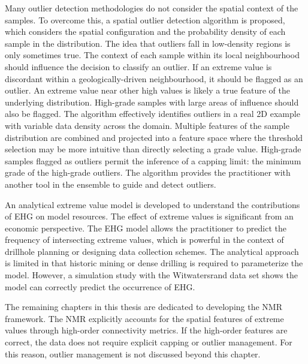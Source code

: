Many outlier detection methodologies do not consider the spatial context of the samples. To overcome this, a spatial outlier detection algorithm is proposed, which considers the spatial configuration and the probability density of each sample in the distribution. The idea that outliers fall in low-density regions is only sometimes true. The context of each sample within its local neighbourhood should influence the decision to classify an outlier. If an extreme value is discordant within a geologically-driven neighbourhood, it should be flagged as an outlier. An extreme value near other high values is likely a true feature of the underlying distribution. High-grade samples with large areas of influence should also be flagged. The algorithm effectively identifies outliers in a real \gls{2D} example with variable data density across the domain. Multiple features of the sample distribution are combined and projected into a feature space where the threshold selection may be more intuitive than directly selecting a grade value. High-grade samples flagged as outliers permit the inference of a capping limit: the minimum grade of the high-grade outliers. The algorithm provides the practitioner with another tool in the ensemble to guide and detect outliers.

An analytical extreme value model is developed to understand the contributions of \gls{EHG} on model resources. The effect of extreme values is significant from an economic perspective. The \gls{EHG} model allows the practitioner to predict the frequency of intersecting extreme values, which is powerful in the context of drillhole planning or designing data collection schemes. The analytical approach is limited in that historic mining or dense drilling is required to parameterize the model. However, a simulation study with the Witwatersrand data set shows the model can correctly predict the occurrence of \gls{EHG}.

The remaining chapters in this thesis are dedicated to developing the \gls{NMR} framework. The \gls{NMR} explicitly accounts for the spatial features of extreme values through high-order connectivity metrics. If the high-order features are correct, the data does not require explicit capping or outlier management. For this reason, outlier management is not discussed beyond this chapter.


